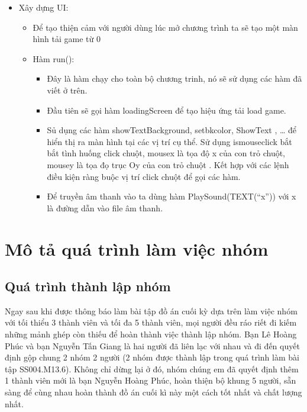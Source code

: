 \documentclass[13pt,a4paper]{article}
\begin{document}
\begin{itemize}
    \item Xây dựng UI:
    \begin{itemize}
        \item Để tạo thiện cảm với người dùng lúc mở chương trình ta sẽ tạo một màn hình tải game từ 0%
        \item Hàm run():
        \begin{itemize}
            \item  Đây là hàm chạy cho toàn bộ chương trinh, nó sẽ sử dụng các hàm đã viết ở trên.
            \item Đầu tiên sẽ gọi hàm loadingScreen để tạo hiệu ứng tải load game. 
            \item Sủ dụng các hàm showTextBackground, setbkcolor, ShowText , … để hiển thị ra màn hình tại các vị trí cụ thể. Sử dụng ismouseclick bắt bắt tình huống click chuột, mousex là tọa độ x của con trỏ chuột, mousey là tọa đọ trục Oy của  con trỏ chuột . Kết hợp với các lệnh điều kiện ràng buộc vị trí click chuột để gọi các hàm.
            \item Để truyền âm thanh vào ta dùng hàm PlaySound(TEXT(“x”)) với x là đường dẫn vào file âm thanh.
        \end{itemize}

    \end{itemize}
 
\end{itemize}
\section{Mô tả quá trình làm việc nhóm }
\subsection{Quá trình thành lập nhóm }

Ngay sau khi được thông báo làm bài tập đồ án cuối kỳ dựa trên làm
việc nhóm với tối thiểu 3 thành viên và tối đa 5 thành viên, mọi người đều ráo riết đi kiếm những mảnh ghép còn thiếu để hoàn thành việc thành lập nhóm. Bạn Lê Hoàng Phúc và bạn Nguyễn Tấn Giang là hai người đã liên lạc với nhau và đi đến quyết định gộp chung 2 nhóm 2 người (2 nhóm được thành lập trong quá trình làm bài tập SS004.M13.6). Không chỉ dừng lại ở đó, nhóm chúng em đã quyết định thêm 1 thành viên mới là bạn Nguyễn Hoàng Phúc, hoàn thiện bộ khung 5 người, sẵn sàng để cùng nhau hoàn thành đồ án cuối kì này một cách tốt nhất và chất lượng nhất.
\end{document}
